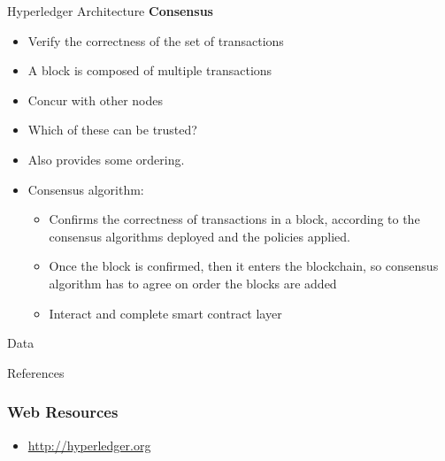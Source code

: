 \documentclass[pdf,table]{beamer}
\begin{document}
\begin{frame}{Hyperledger Architecture \cite{hyperledger:1}}
	{\bf Consensus}
\begin{itemize}
	\item Verify the correctness of the set of transactions
	\item A block is composed of multiple transactions
	\item Concur with other nodes
	\item Which of these can be trusted?
	\item Also provides some ordering.
	\item Consensus algorithm:
		\begin{itemize} \pause
			\item Confirms the correctness of transactions in a block, according to the consensus algorithms deployed and the policies applied.
			\item Once the block is confirmed, then it enters the blockchain, so consensus algorithm has to agree on order the blocks are added
			\item Interact and complete smart contract layer 
		\end{itemize}
\end{itemize}
\end{frame}





\begin{frame}{Data}
\end{frame}


\begin{frame}{References}
    
	\nocite{hyperledger:gaur2018,ferraiolo2001proposed}          
    	
\end{frame}
	
\begin{frame}
	\frametitle{Web Resources}
	\begin{itemize}
	\item \url{http://hyperledger.org}
	\end{itemize}
\end{frame}
\end{document}
